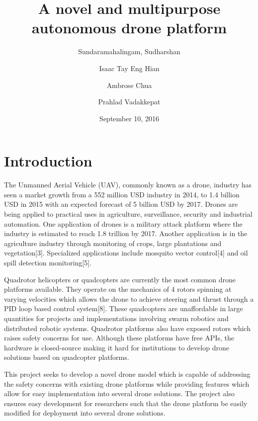 \documentclass[12pt]{article}
\title{A novel and multipurpose autonomous drone platform}
\date{September 10, 2016}
\author{
	Sundaramahalingam, Sudharshan\\
	\and
	Isaac Tay Eng Hian\\
	\and
	Ambrose Chua\\
	\and
	Prahlad Vadakkepat
}
\begin{document}
\maketitle
{}
\newpage
{}

\section{Introduction}

The Unmanned Aerial Vehicle (UAV), commonly known as a drone, industry has seen a market growth from a 552 million USD industry in 2014, to 1.4 billion USD in 2015 with an expected forecast of 5 billion USD by 2017\cite{legalandsocial}. Drones are being applied to practical uses in agriculture, surveillance, security and industrial automation. One application of drones is a military attack platform where the industry is estimated to reach 1.8 trillion by 2017\cite{dronewars}. Another application is in the agriculture industry through monitoring of crops, large plantations and vegetation[3]. Specialized applications include mosquito vector control[4] and oil spill detection monitoring[5]. 

Quadrotor helicopters or quadcopters are currently the most common drone platforms available. They operate on the mechanics of 4 rotors spinning at varying velocities which allows the drone to achieve steering and thrust through a PID loop based control system[8]. These quadcopters are unaffordable in large quantities for projects and implementations involving swarm robotics and distributed robotic systems. Quadrotor platforms also have exposed rotors which raises safety concerns for use. Although these platforms have free APIs, the hardware is closed-source making it hard for institutions to develop drone solutions based on quadcopter platforms.

This project seeks to develop a novel drone model which is capable of addressing the safety concerns with existing drone platforms while providing features which allow for easy implementation into several drone solutions. The project also ensures easy development for researchers such that the drone platform be easily modified for deployment into several drone solutions.
\end{document}
